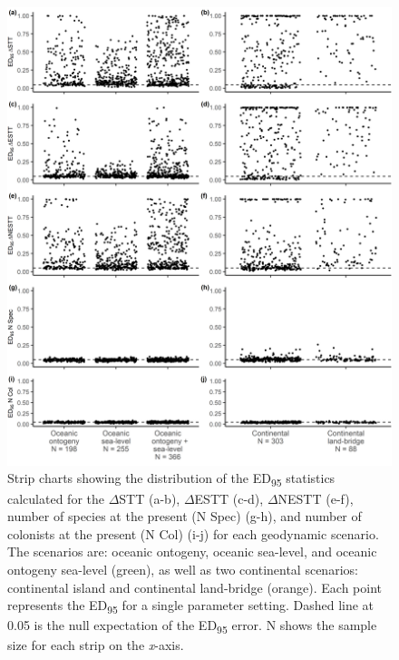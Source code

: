 \begin{figure}
    \centering
    \includegraphics[width=\textwidth]{facet_scenario_iw.png}
    \caption{Strip charts showing the distribution of the ED\textsubscript{95} statistics calculated for the $\Delta$STT (a-b), $\Delta$ESTT (c-d), $\Delta$NESTT (e-f), number of species at the present (N Spec) (g-h), and number of colonists at the present (N Col) (i-j) for each geodynamic scenario. The scenarios are: oceanic ontogeny, oceanic sea-level, and oceanic ontogeny sea-level (green), as well as two continental scenarios: continental island and continental land-bridge (orange). Each point represents the ED\textsubscript{95} for a single parameter setting. Dashed line at 0.05 is the null expectation of the ED\textsubscript{95} error. N shows the sample size for each strip on the \textit{x}-axis.}
    \label{fig:facet_scenario_iw}
\end{figure}

